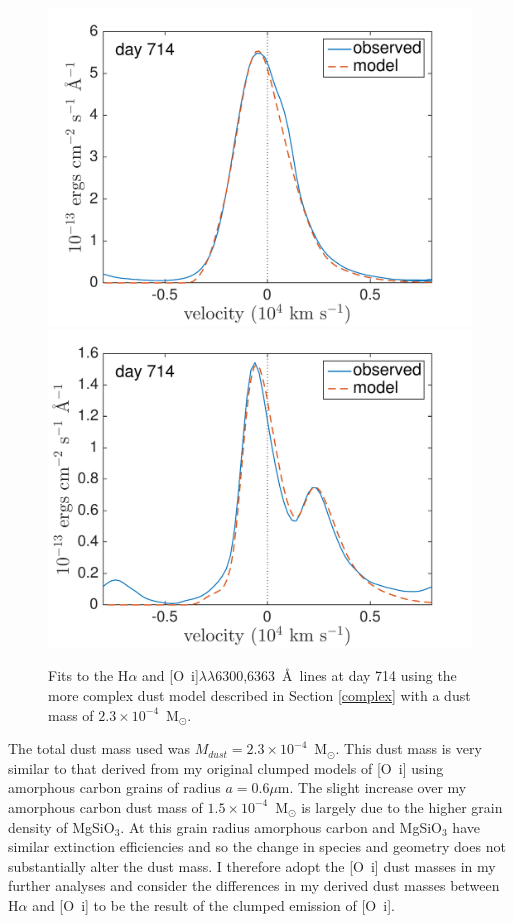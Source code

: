 \begin{figure}
\centering
\includegraphics[scale=0.39,clip=true,trim=0 0 40 20]{chapters/chapter5/images/HaOImod_Ha.pdf}
\includegraphics[scale=0.39, clip=true,trim=0 0 40 20]{chapters/chapter5/images/HaOImod_OI.pdf}
\caption{Fits to the H$\alpha$ and [O~{\sc i}]$\lambda\lambda$6300,6363~\AA\ lines at day 714 using the more complex dust model described in Section \ref{complex} with a dust mass of  $2.3 \times 10^{-4}$~M$_{\odot}$.}
\label{HaOImod}
\end{figure}

The total dust mass used was $M_{dust}=2.3 \times 10^{-4}$~M$_{\odot}$.  This dust mass is very similar to that derived from my original clumped models of [O~{\sc i}] using amorphous carbon grains of radius $a=0.6\mu$m.  The slight increase over my amorphous carbon dust mass of $1.5 \times 10^{-4}$~M$_{\odot}$ is largely due to the higher grain density of MgSiO$_3$.  At this grain radius amorphous carbon and MgSiO$_3$ have similar extinction efficiencies and so the change in species and geometry does not substantially alter the dust mass. I therefore adopt the [O~{\sc i}] dust masses in my further analyses and consider the differences in my derived dust masses between H$\alpha$ and [O~{\sc i}] to be the result of the clumped emission of [O~{\sc i}].


